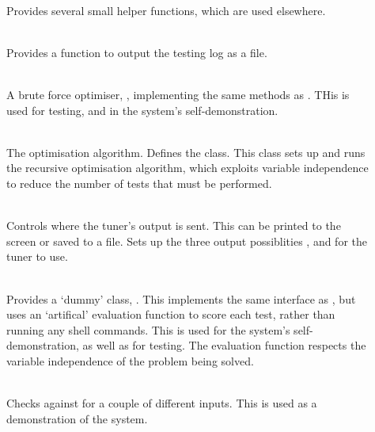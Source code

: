 \documentclass[a4paper, draft]{article}
\begin{document}
\begin{description}
\begin{description}
            \item[] \hfill\\
                Provides several small helper functions, 
                which are used elsewhere.

            \item[] \hfill\\
                Provides a function to output the testing log as a 
                 file.

            \item[] \hfill\\
                A brute force optimiser, , implementing 
                the same methods as . THis is used for 
                testing, and in the system's self-demonstration.

            \item[] \hfill\\
                The optimisation algorithm. Defines the  
                class. This class sets up and runs the recursive optimisation 
                algorithm, which exploits variable independence to reduce 
                the number of tests that must be performed.

            \item[] \hfill\\
                Controls where the tuner's output is sent. This can be printed 
                to the screen or saved to a file. Sets up the three output 
                possiblities ,  and 
                 for the tuner to use.

            \item[] \hfill\\
                Provides a `dummy'  class, 
                . This implements the same interface 
                as , but uses an `artifical' evaluation 
                function to score each test, rather than running any shell 
                commands. This is used for the system's self-demonstration, 
                as well as for testing. The evaluation function respects the 
                variable independence of the problem being solved.

            \item[] \hfill\\
                Checks  against  for 
                a couple of different inputs. This is used as a demonstration 
                of the system.


\end{description}
\end{description}
\end{document}
